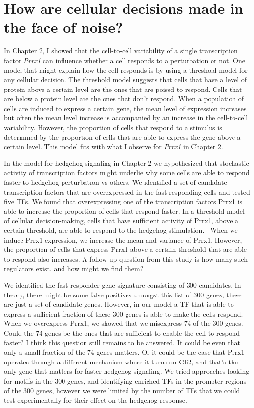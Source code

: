 \section{How are cellular decisions made in the face of noise?}

In Chapter 2, I showed that the cell-to-cell variability of a single transcription factor \emph{Prrx1} can influence whether a cell responds to a perturbation or not. One model that might explain how the cell responds is by using a threshold model for any cellular decision. The threshold model suggests that cells that have a level of protein above a certain level are the ones that are poised to respond. Cells that are below a protein level are the ones that don't respond. When a population of cells are induced to express a certain gene, the mean level of expression increases but often the mean level increase is accompanied by an increase in the cell-to-cell variability. However, the proportion of cells that respond to a stimulus is determined by the proportion of cells that are able to express the gene above a certain level. This model fits with what I observe for \emph{Prrx1} in Chapter 2.

In the model for hedgehog signaling in Chapter 2 we hypothesized that stochastic activity of transcription factors might underlie why some cells are able to respond faster to hedgehog perturbation vs others. We identified a set of candidate transcription factors that are overexpressed in the fast responding cells and tested five TFs. We found that overexpressing one of the transcription factors Prrx1 is able to increase the proportion of cells that respond faster. In a threshold model of cellular decision-making, cells that have sufficient activity of Prrx1, above a certain threshold, are able to respond to the hedgehog stimulation.  When we induce Prrx1 expression, we increase the mean and variance of Prrx1. However, the proportion of cells that express Prrx1 above a certain threshold that are able to respond also increases. A follow-up question from this study is how many such regulators exist, and how might we find them?

We identified the fast-responder gene signature consisting of 300 candidates. In theory, there might be some false positives amongst this list of 300 genes, these are just a set of candidate genes. However, in our model a TF that is able to express a sufficient fraction of these 300 genes is able to make the cells respond. When we overexpress Prrx1, we showed that we misexpress 74 of the 300 genes. Could the 74 genes be the ones that are sufficient to enable the cell to respond faster? I think this question still remains to be answered. It could be even that only a small fraction of the 74 genes matters. Or it could be the case that Prrx1 operates through a different mechanism where it turns on Gli2, and that's the only gene that matters for faster hedgehog signaling. We tried approaches looking for motifs in the 300 genes, and identifying enriched TFs in the promoter regions of the 300 genes, however we were limited by the number of TFs that we could test experimentally for their effect on the hedgehog response. 

